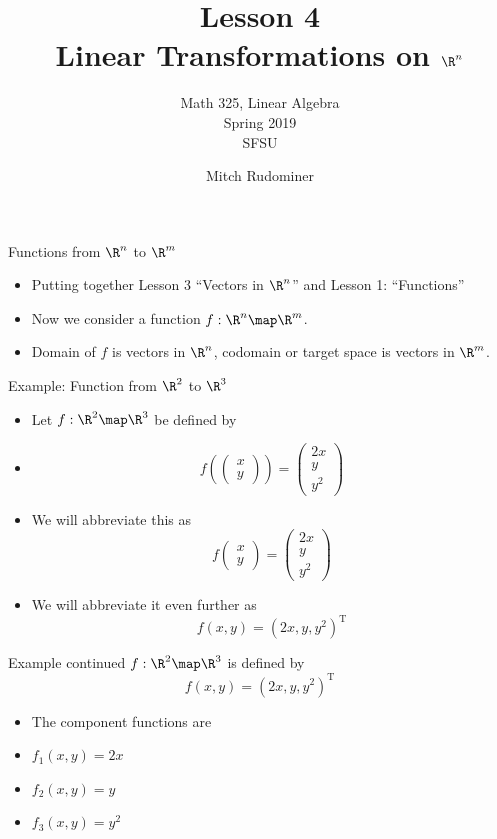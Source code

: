 \documentclass{beamer}
\title{Lesson 4 \\ Linear Transformations on $\R^n$}
\subtitle{Math 325, Linear Algebra \\ Spring 2019 \\ SFSU}
\author{Mitch Rudominer}
\date{}
\begin{document}
\begin{frame}
  \titlepage
\end{frame}


\begin{frame}{Functions from $\R^n$ to $\R^m$}

\begin{itemize}
\item Putting together Lesson 3 ``Vectors in $\R^n$'' and Lesson 1: ``Functions''
\item Now we consider a function $f:\R^n \map \R^m$.
\item Domain of $f$ is vectors in $\R^n$, codomain or target space is vectors
in $\R^m$.
\end{itemize}

\end{frame}


\begin{frame}{Example: Function from $\R^2$ to $\R^3$}
\begin{itemize}
\item Let $f:\R^2\map\R^3$ be defined by
\item
$$
f
\left(
\begin{pmatrix}
x \\ y
\end{pmatrix}
\right)
=
\begin{pmatrix}
2x \\ y \\ y^2
\end{pmatrix}
$$
\item We will abbreviate this as
$$
f
\begin{pmatrix}
x \\ y
\end{pmatrix}
=
\begin{pmatrix}
2x \\ y \\ y^2
\end{pmatrix}
$$
\item We will abbreviate it even further as
$$f(x,y) = (2x, y, y^2)^{\text{T}}$$
\end{itemize}
\end{frame}


\begin{frame}{Example continued}
$f:\R^2\map\R^3$ is defined by
$$f(x,y) = (2x, y, y^2)^{\text{T}}$$
\begin{itemize}
\item The component functions are
\item $f_1(x,y) = 2x$
\item $f_2(x,y) = y$
\item $f_3(x,y) = y^2$
\end{itemize}
\end{frame}
\end{document}
